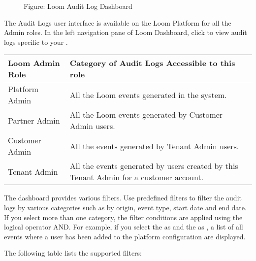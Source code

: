 \documentclass[letterpaper,10pt,english]{sphinxmanual}
\begin{document}
\begin{figure}[htbp]
\centering
\capstart

\noindent{}
\caption{Figure: Loom Audit Log Dashboard}\label{\detokenize{loom_getting_started_guide:id46}}\end{figure}

The Audit Logs user interface is available on the Loom Platform for all the Admin roles. In the left navigation pane of Loom Dashboard, click  to view audit logs specific to your .


\begin{savenotes}\sphinxattablestart
\centering
\begin{tabulary}{\linewidth}[t]{|T|T|}
\hline

Loom Admin Role
&
Category of Audit Logs Accessible to this role
\\
\hline
Platform Admin
&
All the Loom  events generated in the system.
\\
\hline
Partner Admin
&
All the Loom events generated by Customer Admin users.
\\
\hline
Customer Admin
&
All the events generated by Tenant Admin users.
\\
\hline
Tenant Admin
&
All the events generated by users created by this Tenant
Admin for a customer account.
\\
\hline
\end{tabulary}
\par
\sphinxattableend\end{savenotes}

The  dashboard provides various filters. Use predefined filters to filter the audit logs by various categories such as by origin, event type, start date and end date. If you select more than one category, the filter conditions are applied using the logical operator AND. For example, if you select the  as  and the  as , a list of all events where a user has been added to the platform configuration are displayed.

The following table lists the supported filters:
\end{document}

